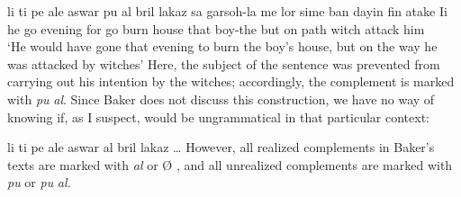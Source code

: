 \ea\label{ex:2:37}
 \gll li ti pe ale aswar pu al bril lakaz sa garsoh-la me lor sime ban dayin fin atake Ii\\
he {\TNS} {\MOD} go evening for go burn house that boy-the  but on path {\PL} witch {\COMP} attack him\\
\glt `He would have gone that evening to burn the boy's house, but on the way he was attacked by witches'
\z
Here, the subject of the sentence was prevented from carrying out his intention by the witches; accordingly, the complement is marked with \textit{pu} \textit{al}. Since Baker does not discuss this construction, we have no way of knowing if, as I suspect,  would be ungrammatical in that particular context:

\ea\label{ex:2:38}
 li ti pe ale aswar al bril lakaz \ldots 
\z
However, all realized complements in Baker's texts are marked with \textit{al} or {\O} , and all unrealized complements are marked with \textit{pu} or \textit{pu} \textit{al.}

